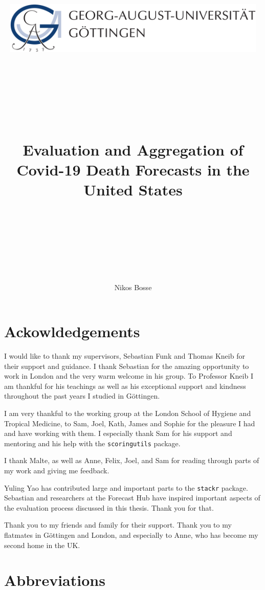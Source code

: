 \documentclass[
]{book}
\title{\includegraphics[width=5in,height=\textheight]{logo_university.png}

\(~~~~~\)

\(~~~~~\)

\textbf{Evaluation and Aggregation of Covid-19 Death Forecasts in the United States}

\(~~~~~\)

\(~~~~~\)}
\author{Nikos Bosse}
\date{\(~~~~~\)
\textbf{A master thesis in Applied Statistics}

\(~\)

Submitted to the Faculty of Business and Economic Sciences at Göttingen University in September 2020}
\begin{document}
\maketitle

\hypertarget{ackowldedgements}{%
\chapter*{Ackowldedgements}\label{ackowldedgements}}

I would like to thank my supervisors, Sebastian Funk and Thomas Kneib for their support and guidance. I thank Sebastian for the amazing opportunity to work in London and the very warm welcome in his group. To Professor Kneib I am thankful for his teachings as well as his exceptional support and kindness throughout the past years I studied in Göttingen.

I am very thankful to the working group at the London School of Hygiene and Tropical Medicine, to Sam, Joel, Kath, James and Sophie for the pleasure I had and have working with them. I especially thank Sam for his support and mentoring and his help with the \texttt{scoringutils} package.

I thank Malte, as well as Anne, Felix, Joel, and Sam for reading through parts of my work and giving me feedback.

Yuling Yao has contributed large and important parts to the \texttt{stackr} package. Sebastian and researchers at the Forecast Hub have inspired important aspects of the evaluation process discussed in this thesis. Thank you for that.

Thank you to my friends and family for their support. Thank you to my flatmates in Göttingen and London, and especially to Anne, who has become my second home in the UK.

\hypertarget{abbreviations}{%
\chapter*{Abbreviations}\label{abbreviations}}
\end{document}
